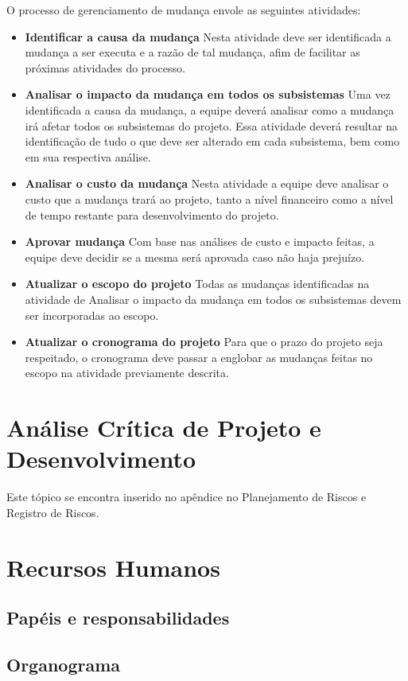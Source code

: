     O processo de gerenciamento de mudança envole as seguintes atividades:
\begin{itemize}
    \item \textbf{Identificar a causa da mudança}
        Nesta atividade deve ser identificada a mudança a ser executa e a razão de tal mudança, afim de facilitar as próximas atividades do processo.

    \item \textbf{Analisar o impacto da mudança em todos os subsistemas}
        Uma vez identificada a causa da mudança, a equipe deverá analisar como a mudança irá afetar todos os subsistemas do projeto. Essa atividade deverá resultar na identificação de tudo o que deve ser alterado em cada subsistema, bem como em sua respectiva análise.

    \item \textbf{Analisar o custo da mudança}
        Nesta atividade a equipe deve analisar o custo que a mudança trará ao projeto, tanto a nível financeiro como a nível de tempo restante para desenvolvimento do projeto.

    \item\textbf{Aprovar mudança}
        Com base nas análises de custo e impacto feitas, a equipe deve decidir se a mesma será aprovada caso não haja prejuízo.

    \item \textbf{Atualizar o escopo do projeto}
        Todas as mudanças identificadas na atividade de Analisar o impacto da mudança em todos os subsistemas devem ser incorporadas ao escopo.

    \item \textbf{Atualizar o cronograma do projeto}
        Para que o prazo do projeto seja respeitado, o cronograma deve passar a englobar as mudanças feitas no escopo na atividade previamente descrita.

\end{itemize}

\section{Análise Crítica de Projeto e Desenvolvimento}
    Este tópico se encontra inserido no apêndice no Planejamento de Riscos e Registro de Riscos.

\section{Recursos Humanos}
\subsection{Papéis e responsabilidades}

\subsection{Organograma}    

    
    

